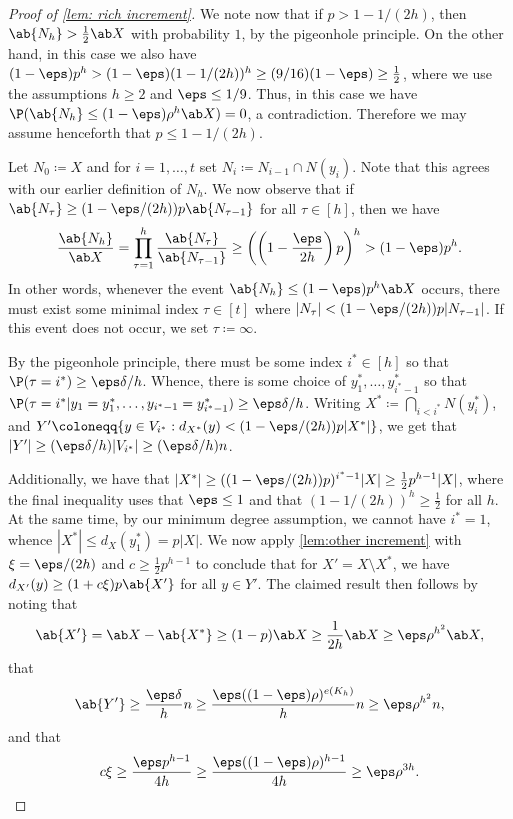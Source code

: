 \begin{proof}[Proof of \cref{lem: rich increment}]
We note now that if $p > 1-1/(2h)$, then $\ab{N_h} > \frac 12 \ab X$ with probability $1$, by the pigeonhole principle. On the other hand, in this case we also have $(1-\eps)p^h > (1-\eps)(1-1/(2h))^h \geq (9/16)(1-\eps)\geq\frac 12$, where we use the assumptions $h \geq 2$ and $\eps \leq 1/9$. Thus, in this case we have $\P(\ab{N_h} \leq (1-\eps) \rho^h \ab X) = 0$, a contradiction. Therefore we may assume henceforth that $p \leq 1-1/(2h)$.

Let $N_0\coloneqq X$ and for $i =1,\dots ,t$ set $N_i\coloneqq N_{i-1}\cap N(y_i)$. Note that this agrees with our earlier definition of $N_h$. We now observe that if $\ab{N_\tau} \geq (1-\eps/(2h)) p \ab{N_{\tau-1}}$ for all $\tau \in [h]$, then we have
\[
\frac{\ab{N_h}}{\ab X} = \prod_{\tau=1}^h \frac{\ab{N_\tau}}{\ab{N_{\tau-1}}} \geq \left( \left( 1- \frac{\eps}{2h}\right) p\right)^h > (1-\eps) p^h.
\]
In other words, whenever the event $\ab{N_h}\leq (1-\eps)p^h \ab X$ occurs, there 
must exist some minimal index $\tau\in [t]$ where $|N_\tau|<(1-\eps/(2h))p|N_{\tau-1}|$. If this event does not occur, we set $\tau\coloneqq \infty$.

By the pigeonhole principle, there must be some index $i^*\in [h]$ so that $\P(\tau = i^*)\ge \eps\delta/h$. Whence, there is some choice of $y_1^*,\dots,y_{i^*-1}^*$ so that $\P(\tau = i^*|y_1=y_1^*,\dots,y_{i^*-1}=y_{i^*-1}^*) \ge \eps\delta/h $. Writing $X^*\coloneqq  \bigcap_{i<i^*}N(y_i^*)$, and $Y' \coloneqq  \{y\in V_{i^*}: d_{X^*}(y)<(1-\eps/(2h))p|X^*|\}$, we get that $|Y'| \ge (\eps\delta/h)|V_{i^*}|\ge (\eps \delta/h)n$.

Additionally, we have that $|X^*|\ge ((1-\eps/(2h))p)^{i^*-1}|X|\ge \frac 12 p^{h-1}|X|$, where the final inequality uses that $\eps \leq 1$ and that $(1-1/(2h))^h \geq \frac 12$ for all $h$. At the same time, by our minimum degree assumption, we cannot have $i^*=1$, whence $|X^*|\le d_X(y_1^*) = p|X|$. We now apply \cref{lem:other increment} with $\xi = \eps/(2h)$ and $c \geq \frac 12 p^{h-1}$ to conclude that for $X' = X \setminus X^*$, we have $d_{X'}(y) \geq (1+c\xi)p \ab{X'}$ for all $y \in Y'$. The claimed result then follows by noting that
\[
\ab {X'} = \ab X - \ab{X^*} \geq (1-p)\ab X \geq \frac 1{2h} \ab X \geq \eps \rho^{h^2} \ab X,
\]
that
\[
\ab{Y'} \geq \frac{\eps \delta}{h}n \geq \frac{\eps((1-\eps)\rho)^{e(K_h)}}{h}n \geq \eps \rho^{h^2}n,
\]
and that
\[
c \xi \geq \frac{\eps p^{h-1}}{4h} \geq \frac{\eps((1-\eps)\rho)^{h-1}}{4h} \geq \eps \rho^{3h}.\qedhere
\]
\end{proof}





